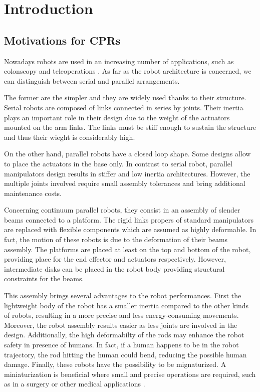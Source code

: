 \documentclass{thesisreport}
\begin{document}
 
 \chapter*{Introduction}
 \section{Motivations for CPRs}
  Nowadays robots are used in an increasing number of applications, such as colonscopy \cite{black_modeling_2017} and teleoperations \cite{till_efficient_2015}.
 As far as the robot architecture is concerned, we can distinguish between serial and parallel arrangements.
 
 The former are the simpler and they are widely used thanks to their structure. Serial robots are composed of links connected in series by joints. Their inertia plays an important role in their design due to the weight of the actuators mounted on the arm links. The links must be stiff enough to sustain the structure and thus their wieght is considerably high.

 On the other hand, parallel robots have a closed loop shape. Some designs allow to place the actuators in the base only. In contrast to serial robot, parallel manipulators design results in stiffer and low inertia architectures. However, the multiple joints involved require small assembly tolerances and bring additional maintenance costs.
 
 Concerning continuum parallel robots, they consist in an assembly of slender beams connected to a platform. The rigid links propers of standard manipulators are replaced with flexible components which are assumed as highly deformable. In fact, the motion of these robots is due to the deformation of their beams assembly.
 The platforms are placed at least on the top and bottom of the robot, providing place for the end effector and actuators respectively. However, intermediate disks can be placed in the robot body providing structural constraints for the beams.  
 
 This assembly brings several advantages to the robot performances. First the lightweight body of the robot has a smaller inertia compared to the other kinds of robots, resulting in a more precise and less energy-consuming movements. Moreover, the robot assembly results easier as less joints are involved in the design. Additionally, the high deformabilty of the rods may enhance the robot safety in presence of humans. In fact, if a human happens to be in the robot trajectory, the rod hitting the human could bend, reducing the possible human damage. Finally, these robots have the possibility to be mignaturized. A miniaturization is beneficial where small and precise operations are required, such as in a surgery or other medical applications \cite{black_modeling_2017}. 
 
\end{document}
